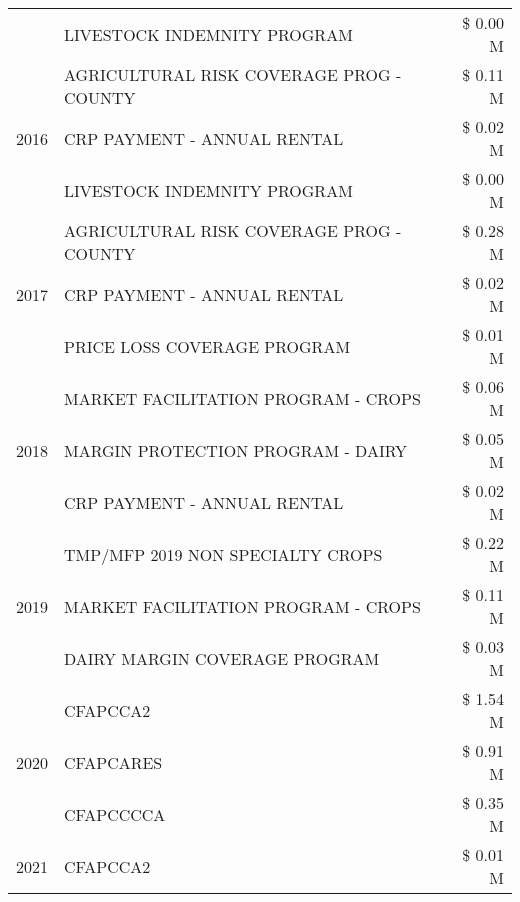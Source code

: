 \begin{tabular}{llr}
 & LIVESTOCK INDEMNITY PROGRAM & \$ 0.00 M \\
\cline{1-3}
\multirow[t]{3}{*}{2016} & AGRICULTURAL RISK COVERAGE PROG - COUNTY & \$ 0.11 M \\
 & CRP PAYMENT - ANNUAL RENTAL & \$ 0.02 M \\
 & LIVESTOCK INDEMNITY PROGRAM & \$ 0.00 M \\
\cline{1-3}
\multirow[t]{3}{*}{2017} & AGRICULTURAL RISK COVERAGE PROG - COUNTY & \$ 0.28 M \\
 & CRP PAYMENT - ANNUAL RENTAL & \$ 0.02 M \\
 & PRICE LOSS COVERAGE PROGRAM & \$ 0.01 M \\
\cline{1-3}
\multirow[t]{3}{*}{2018} & MARKET FACILITATION PROGRAM - CROPS & \$ 0.06 M \\
 & MARGIN PROTECTION PROGRAM - DAIRY & \$ 0.05 M \\
 & CRP PAYMENT - ANNUAL RENTAL & \$ 0.02 M \\
\cline{1-3}
\multirow[t]{3}{*}{2019} & TMP/MFP 2019 NON SPECIALTY CROPS & \$ 0.22 M \\
 & MARKET FACILITATION PROGRAM - CROPS & \$ 0.11 M \\
 & DAIRY MARGIN COVERAGE PROGRAM & \$ 0.03 M \\
\cline{1-3}
\multirow[t]{3}{*}{2020} & CFAPCCA2 & \$ 1.54 M \\
 & CFAPCARES & \$ 0.91 M \\
 & CFAPCCCCA & \$ 0.35 M \\
\cline{1-3}
2021 & CFAPCCA2 & \$ 0.01 M \\
\cline{1-3}
\bottomrule
\end{tabular}
